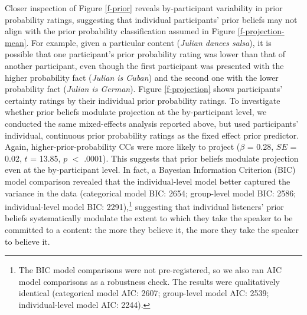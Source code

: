 \documentclass[OpenMind]{stjour}
\begin{document}
Closer inspection of  Figure \ref{f-prior} reveals by-participant variability in prior probability ratings, suggesting that individual participants' prior beliefs may not align with the prior probability classification assumed in  Figure \ref{f-projection-mean}. For example, given a particular content ({\em Julian dances salsa}), it is possible that one participant's prior probability rating was lower than that of another participant, even though the first participant was presented with the higher probability fact ({\em Julian is Cuban}) and the second one with the lower probability fact ({\em Julian is German}). Figure \ref{f-projection} shows participants' certainty ratings by their individual prior probability ratings. %
To investigate whether prior beliefs modulate projection at the by-participant level,  we conducted the same mixed-effects analysis reported above, but used participants' individual, continuous prior probability ratings as the fixed effect prior predictor. Again, higher-prior-probability CCs were more likely to project ($\beta$ = 0.28, $SE$ = 0.02, $t$ = 13.85, $p$ $<$ .0001). This  suggests that prior beliefs modulate projection even at the by-participant level. In fact, a Bayesian Information Criterion (BIC) model comparison  revealed that the individual-level model better captured the variance in the data (categorical model BIC: 2654; group-level model BIC: 2586; individual-level model BIC: 2291),\footnote{The BIC model comparisons were not pre-registered, so we also ran AIC model comparisons as a robustness check. The results were qualitatively identical (categorical model AIC: 2607; group-level model AIC: 2539; individual-level model AIC: 2244).} suggesting that individual listeners' prior beliefs systematically modulate the extent to which they take the speaker to be committed to a content: the more they believe it, the more they take the speaker to believe it.
\end{document}
